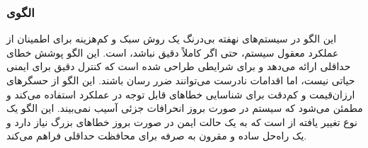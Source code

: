 \subsubsection{الگوی }
\label{archSafeSanityChkSec}
\begin{RTL}
این الگو در سیستم‌های نهفته بی‌درنگ یک روش سبک و کم‌هزینه
برای اطمینان از عملکرد معقول سیستم، حتی اگر کاملاً دقیق نباشد، است.
این الگو پوشش خطای حداقلی ارائه می‌دهد و برای شرایطی طراحی شده است که
کنترل دقیق برای ایمنی حیاتی نیست، اما اقدامات نادرست می‌توانند ضرر رسان باشند.
این الگو از حسگرهای ارزان‌قیمت و کم‌دقت برای شناسایی خطاهای قابل توجه
در عملکرد استفاده می‌کند و مطمئن می‌شود که سیستم در
صورت بروز انحرافات جزئی آسیب نمی‌بیند. این الگو یک نوع تغییر یافته از
 است که به یک حالت ایمن در صورت
بروز خطاهای بزرگ نیاز دارد و یک راه‌حل ساده و مقرون به صرفه
برای محافظت حداقلی فراهم می‌کند.
\end{RTL}